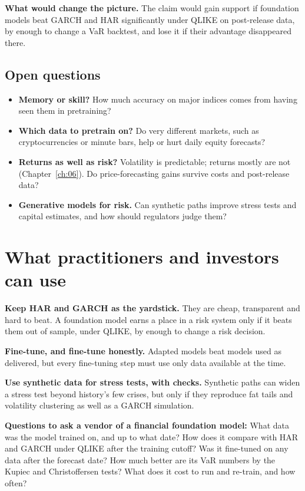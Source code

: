 \textbf{What would change the picture.} The claim would gain support if foundation models beat GARCH and HAR significantly under QLIKE on post-release data, by enough to change a VaR backtest, and lose it if their advantage disappeared there.

\subsection{Open questions}
\label{sec:23-open}

\begin{itemize}
  \item \textbf{Memory or skill?} How much accuracy on major indices comes from having seen them in pretraining?
  \item \textbf{Which data to pretrain on?} Do very different markets, such as cryptocurrencies or minute bars, help or hurt daily equity forecasts?
  \item \textbf{Returns as well as risk?} Volatility is predictable; returns mostly are not (Chapter~\ref{ch:06}). Do price-forecasting gains survive costs and post-release data?
  \item \textbf{Generative models for risk.} Can synthetic paths improve stress tests and capital estimates, and how should regulators judge them?
\end{itemize}

\section{What practitioners and investors can use}
\label{sec:23-investors}

\textbf{Keep HAR and GARCH as the yardstick.} They are cheap, transparent and hard to beat. A foundation model earns a place in a risk system only if it beats them out of sample, under QLIKE, by enough to change a risk decision.

\textbf{Fine-tune, and fine-tune honestly.} Adapted models beat models used as delivered, but every fine-tuning step must use only data available at the time.

\textbf{Use synthetic data for stress tests, with checks.} Synthetic paths can widen a stress test beyond history's few crises, but only if they reproduce fat tails and volatility clustering as well as a GARCH simulation.

\textbf{Questions to ask a vendor of a financial foundation model:} What data was the model trained on, and up to what date? How does it compare with HAR and GARCH under QLIKE after the training cutoff? Was it fine-tuned on any data after the forecast date? How much better are its VaR numbers by the Kupiec and Christoffersen tests? What does it cost to run and re-train, and how often?

